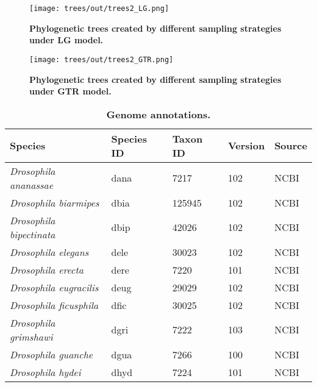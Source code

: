 \begin{figure}[h!]
\texttt{[image: trees/out/trees2\_LG.png]}
\centering
\caption{\textbf{Phylogenetic trees created by different sampling strategies under LG model.}}
\label{sfig:trees_LG}
\end{figure}

\begin{figure}[h!]
\texttt{[image: trees/out/trees2\_GTR.png]}
\centering
\caption{\textbf{Phylogenetic trees created by different sampling strategies under GTR model.}}
\label{sfig:trees_GTR}
\end{figure}

\begin{table}[h!]
\centering
\caption{\textbf{Genome annotations.}}
\label{stable:genomes}
\begin{tabular}{|l|l|l|l|l|}
\hline
\textbf{Species}                       & \textbf{Species ID} & \textbf{Taxon ID} & \textbf{Version} & \textbf{Source} \\ \hline
\textit{Drosophila ananassae}          & dana                & 7217              & 102              & NCBI            \\ \hline
\textit{Drosophila biarmipes}          & dbia                & 125945            & 102              & NCBI            \\ \hline
\textit{Drosophila bipectinata}        & dbip                & 42026             & 102              & NCBI            \\ \hline
\textit{Drosophila elegans}            & dele                & 30023             & 102              & NCBI            \\ \hline
\textit{Drosophila erecta}             & dere                & 7220              & 101              & NCBI            \\ \hline
\textit{Drosophila eugracilis}         & deug                & 29029             & 102              & NCBI            \\ \hline
\textit{Drosophila ficusphila}         & dfic                & 30025             & 102              & NCBI            \\ \hline
\textit{Drosophila grimshawi}          & dgri                & 7222              & 103              & NCBI            \\ \hline
\textit{Drosophila guanche}            & dgua                & 7266              & 100              & NCBI            \\ \hline
\textit{Drosophila hydei}              & dhyd                & 7224              & 101              & NCBI            \\ \hline

\end{tabular}
\end{table}
